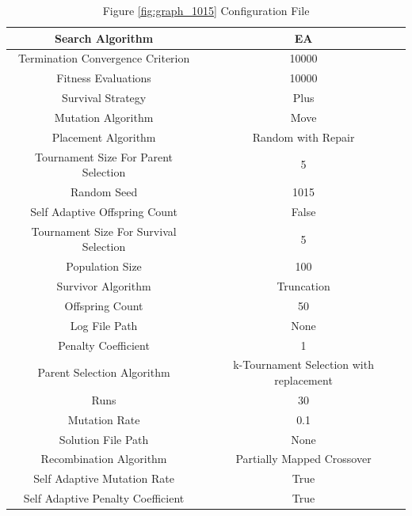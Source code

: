 \documentclass{standalone}
\begin{document}
\begin{table}[!htb]
	\centering
	\caption{Figure \ref{fig:graph_1015} Configuration File}
	\label{tab:graph_1015}
	\begin{tabular}{| c | c |}
		\hline
		Search Algorithm		& EA		 \\
		\hline
		Termination Convergence Criterion		& 10000		 \\
		\hline
		Fitness Evaluations		& 10000		 \\
		\hline
		Survival Strategy		& Plus		 \\
		\hline
		Mutation Algorithm		& Move		 \\
		\hline
		Placement Algorithm		& Random with Repair		 \\
		\hline
		Tournament Size For Parent Selection		& 5		 \\
		\hline
		Random Seed		& 1015		 \\
		\hline
		Self Adaptive Offspring Count		& False		 \\
		\hline
		Tournament Size For Survival Selection		& 5		 \\
		\hline
		Population Size		& 100		 \\
		\hline
		Survivor Algorithm		& Truncation		 \\
		\hline
		Offspring Count		& 50		 \\
		\hline
		Log File Path		& None		 \\
		\hline
		Penalty Coefficient		& 1		 \\
		\hline
		Parent Selection Algorithm		& k-Tournament Selection with replacement		 \\
		\hline
		Runs		& 30		 \\
		\hline
		Mutation Rate		& 0.1		 \\
		\hline
		Solution File Path		& None		 \\
		\hline
		Recombination Algorithm		& Partially Mapped Crossover		 \\
		\hline
		Self Adaptive Mutation Rate		& True		 \\
		\hline
		Self Adaptive Penalty Coefficient		& True		 \\
		\hline
	\end{tabular}
\end{table}
\end{document}
